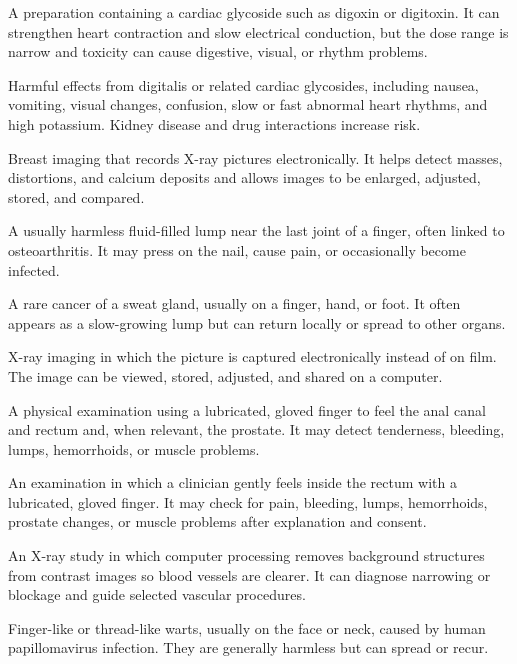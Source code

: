  A preparation containing a cardiac glycoside such as digoxin or digitoxin. It can strengthen heart contraction and slow electrical conduction, but the dose range is narrow and toxicity can cause digestive, visual, or rhythm problems.

 Harmful effects from digitalis or related cardiac glycosides, including nausea, vomiting, visual changes, confusion, slow or fast abnormal heart rhythms, and high potassium. Kidney disease and drug interactions increase risk.

 Breast imaging that records X-ray pictures electronically. It helps detect masses, distortions, and calcium deposits and allows images to be enlarged, adjusted, stored, and compared.

 A usually harmless fluid-filled lump near the last joint of a finger, often linked to osteoarthritis. It may press on the nail, cause pain, or occasionally become infected.

 A rare cancer of a sweat gland, usually on a finger, hand, or foot. It often appears as a slow-growing lump but can return locally or spread to other organs.

 X-ray imaging in which the picture is captured electronically instead of on film. The image can be viewed, stored, adjusted, and shared on a computer.

 A physical examination using a lubricated, gloved finger to feel the anal canal and rectum and, when relevant, the prostate. It may detect tenderness, bleeding, lumps, hemorrhoids, or muscle problems.

 An examination in which a clinician gently feels inside the rectum with a lubricated, gloved finger. It may check for pain, bleeding, lumps, hemorrhoids, prostate changes, or muscle problems after explanation and consent.

 An X-ray study in which computer processing removes background structures from contrast images so blood vessels are clearer. It can diagnose narrowing or blockage and guide selected vascular procedures.

 Finger-like or thread-like warts, usually on the face or neck, caused by human papillomavirus infection. They are generally harmless but can spread or recur.

